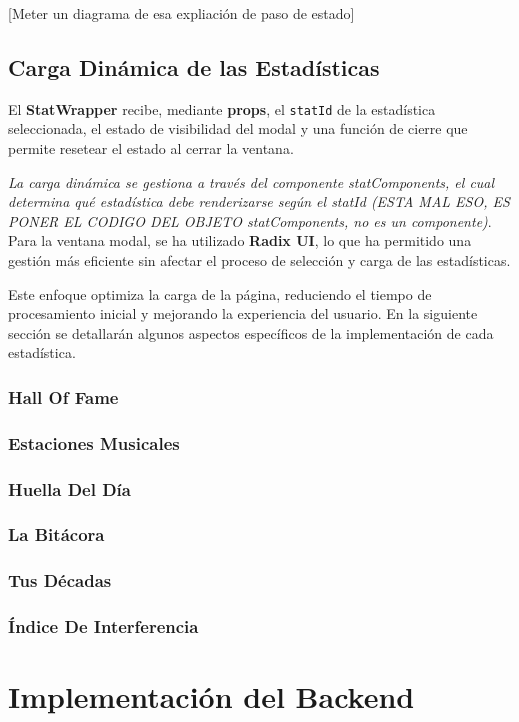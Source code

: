     [Meter un diagrama de esa expliación de paso de estado]

\subsection*{Carga Dinámica de las Estadísticas}

El \textbf{StatWrapper} recibe, mediante \textbf{props}, el \texttt{statId} de la estadística seleccionada, el estado de visibilidad del modal y una función de cierre que permite resetear el estado al cerrar la ventana.

\textit{La carga dinámica se gestiona a través del componente statComponents, el cual determina qué estadística debe renderizarse según el statId (ESTA MAL ESO, ES PONER EL CODIGO DEL OBJETO statComponents, no es un componente)}. Para la ventana modal, se ha utilizado \textbf{Radix UI}, lo que ha permitido una gestión más eficiente sin afectar el proceso de selección y carga de las estadísticas.

Este enfoque optimiza la carga de la página, reduciendo el tiempo de procesamiento inicial y mejorando la experiencia del usuario. En la siguiente sección se detallarán algunos aspectos específicos de la implementación de cada estadística.

\subsubsection*{Hall Of Fame}
\subsubsection*{Estaciones Musicales}
\subsubsection*{Huella Del Día}
\subsubsection*{La Bitácora}
\subsubsection*{Tus Décadas}
\subsubsection*{Índice De Interferencia}


\section{Implementación del Backend}

